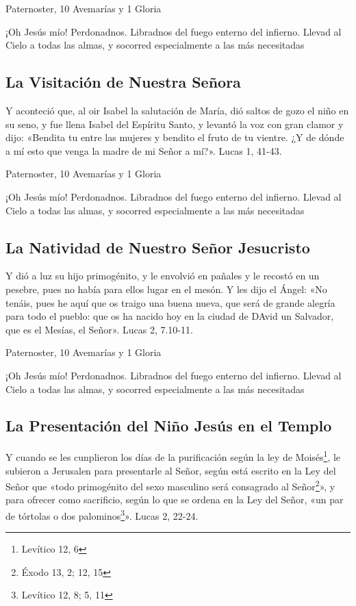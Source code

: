 \documentclass[a4paper,11pt, oneside]{report}
\begin{document}
         Paternoster, 10 Avemarías y 1 Gloria
        
        \medskip
        ¡Oh Jesús mío! Perdonadnos. Libradnos del fuego enterno del infierno. Llevad al Cielo a todas las almas, y socorred especialmente a las más 
        necesitadas

      \subsection*{La Visitación de Nuestra Señora}
        Y aconteció que, al oir Isabel la salutación de María, dió saltos de gozo el niño en su seno, y fue llena Isabel del Espíritu Santo, y levantó la voz con gran
        clamor y dijo: «Bendita tu entre las mujeres y bendito el fruto de tu vientre. ¿Y de dónde a mí esto que venga la madre de mi Señor a mí?». 
        Lucas 1, 41-43.
        
         Paternoster, 10 Avemarías y 1 Gloria
        
        \medskip
        ¡Oh Jesús mío! Perdonadnos. Libradnos del fuego enterno del infierno. Llevad al Cielo a todas las almas, y socorred especialmente a las más 
        necesitadas
                      
      \subsection*{La Natividad de Nuestro Señor Jesucristo}
        Y dió a luz su hijo primogénito, y le envolvió en pañales y le recostó en un pesebre, pues no había para ellos lugar en el mesón.
        Y les dijo el Ángel: «No tenáis, pues he aquí que os traigo una buena nueva, que será de grande alegría para todo el pueblo: que os ha nacido hoy en la ciudad de DAvid
        un Salvador, que es el Mesías, el Señor». Lucas 2, 7.10-11.
        
         Paternoster, 10 Avemarías y 1 Gloria
        
        \medskip
        ¡Oh Jesús mío! Perdonadnos. Libradnos del fuego enterno del infierno. Llevad al Cielo a todas las almas, y socorred especialmente a las más 
        necesitadas
    
      \subsection*{La Presentación del Niño Jesús en el Templo}
        Y cuando se les cunplieron los días de la purificación según la ley de Moisés\footnote{Levítico 12, 6}, le subieron a Jerusalen para presentarle al Señor, según está escrito
        en la Ley del Señor que «todo primogénito del sexo masculino será consagrado al Señor\footnote{Éxodo 13, 2; 12, 15}», y para ofrecer como sacrificio, según lo que 
        se ordena en la Ley del Señor, «un par de tórtolas o dos palominos\footnote{Levítico 12, 8; 5, 11}». Lucas 2, 22-24.
        
\end{document}

